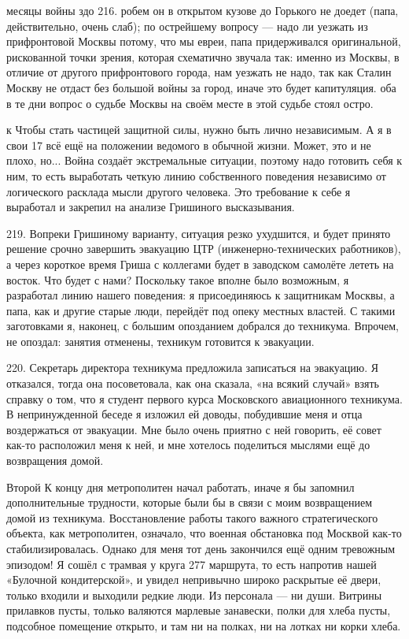 месяцы войны здо 216. робем он в открытом кузове до Горького не доедет (папа, действительно, очень слаб); по острейшему вопросу — надо ли уезжать из прифронтовой Москвы потому, что мы евреи, папа придерживался оригинальной, рискованной точки зрения, которая схематично звучала так: именно из Москвы, в отличие от другого прифронтового города, нам уезжать не надо, так как Сталин Москву не отдаст без большой войны за город, иначе это будет капитуляция. оба в те дни вопрос о судьбе Москвы на своём месте в этой судьбе стоял остро.

к Чтобы стать частицей защитной силы, нужно быть лично независимым. А я в свои 17 всё ещё на положении ведомого в обычной жизни. Может, это и не плохо, но... Война создаёт экстремальные ситуации, поэтому надо готовить себя к ним, то есть выработать четкую линию собственного поведения независимо от логического расклада мысли другого человека. Это требование к себе я выработал и закрепил на анализе Гришиного высказывания.

219. Вопреки Гришиному варианту, ситуация резко ухудшится, и будет принято решение срочно завершить эвакуацию ЦТР (инженерно-технических работников), а через короткое время Гриша с коллегами будет в заводском самолёте лететь на восток. Что будет с нами? Поскольку такое вполне было возможным, я разработал линию нашего поведения: я присоединяюсь к защитникам Москвы, а папа, как и другие старые люди, перейдёт под опеку местных властей. С такими заготовками я, наконец, с большим опозданием добрался до техникума. Впрочем, не опоздал: занятия отменены, техникум готовится к эвакуации.

220. Секретарь директора техникума предложила записаться на эвакуацию. Я отказался, тогда она посоветовала, как она сказала, «на всякий случай» взять справку о том, что я студент первого курса Московского авиационного техникума. В непринужденной беседе я изложил ей доводы, побудившие меня и отца воздержаться от эвакуации. Мне было очень приятно с ней говорить, её совет как-то расположил меня к ней, и мне хотелось поделиться мыслями ещё до возвращения домой.

Второй
К концу дня метрополитен начал работать, иначе я бы запомнил дополнительные трудности, которые были бы в связи с моим возвращением домой из техникума. Восстановление работы такого важного стратегического объекта, как метрополитен, означало, что военная обстановка под Москвой как-то стабилизировалась. Однако для меня тот день закончился ещё одним тревожным эпизодом! Я сошёл с трамвая у круга 277 маршрута, то есть напротив нашей «Булочной кондитерской», и увидел непривычно широко раскрытые её двери, только входили и выходили редкие люди. Из персонала — ни души. Витрины прилавков пусты, только валяются марлевые занавески, полки для хлеба пусты, подсобное помещение открыто, и там ни на полках, ни на лотках ни корки хлеба.

